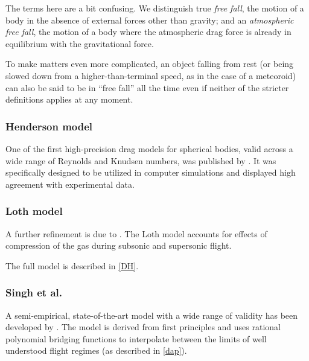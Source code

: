             \begin{example}
                The terms here are a bit confusing. We distinguish true \emph{free fall},
                the motion of a body in the absence of external forces other than gravity;
                and an \emph{atmospheric free fall}, the motion of a body where the atmospheric
                drag force is already in equilibrium with the gravitational force.

                To make matters even more complicated, an object falling from rest
                (or being slowed down from a higher-than-terminal speed, as in the case of a meteoroid)
                can also be said to be in ``free fall'' all the time even if neither
                of the stricter definitions applies at any moment.
            \end{example}

        \subsubsection{Henderson model} \label{fdmH}
            One of the first high-precision drag models for spherical bodies,
            valid across a wide range of Reynolds and Knudsen numbers, was published by \citet{henderson1976}.
            It was specifically designed to be utilized in computer simulations
            and displayed high agreement with experimental data.

        \subsubsection{Loth model} \label{fdmL}
            A further refinement is due to \citet{loth2008}.
            The Loth model accounts for effects of compression of the gas
            during subsonic and supersonic flight.

            The full model is described in \cref{DH}.

        \subsubsection{Singh et al.} \label{fdmS}
            A semi-empirical, state-of-the-art model with a wide range of validity has been developed by
            \citet{singh+2020}. The model is derived from first principles and
            uses rational polynomial bridging functions to interpolate between
            the limits of well understood flight regimes (as described in \cref{dap}).

